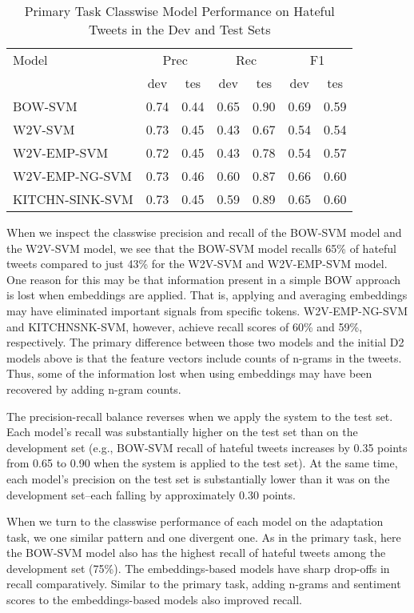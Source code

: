 \documentclass[11pt,a4paper]{article}
\begin{document}
\begin{table}[h]
\centering
\caption{Primary Task Classwise Model Performance on Hateful Tweets in the Dev and Test Sets}
\label{tab:prim_class_test}
\tiny
\begin{tabular}{lcccccc}
    \hline
Model
            & \multicolumn{2}{c}{Prec}
                    & \multicolumn{2}{c}{Rec}
                            & \multicolumn{2}{c}{F1}                \\
    &   dev  &   tes  &   dev  &   tes  &   dev  &   tes    \\
    \hline
BOW-SVM    &   0.74  &  0.44  & 0.65 & 0.90 & 0.69  &  0.59   \\
W2V-SVM   &   0.73  &   0.45  &   0.43  &   0.67  &   0.54  &  0.54 \\
W2V-EMP-SVM   &  0.72  & 0.45 &  0.43 & 0.78 &  0.54 & 0.57 \\
W2V-EMP-NG-SVM &  0.73 & 0.46 & 0.60  & 0.87 & 0.66 & 0.60 \\
KITCHN-SINK-SVM & 0.73  & 0.45 & 0.59 & 0.89 & 0.65 &  0.60 \\
    \hline
\end{tabular}
\end{table}


When we inspect the classwise precision and recall of the BOW-SVM model and the W2V-SVM model, we see that the BOW-SVM model recalls 65\% of hateful tweets compared to just 43\% for the W2V-SVM and W2V-EMP-SVM model. One reason for this may be that information present in a simple BOW approach is lost when embeddings are applied. That is, applying and averaging embeddings may have eliminated important signals from specific tokens. W2V-EMP-NG-SVM and KITCHNSNK-SVM, however, achieve recall scores of 60\% and 59\%, respectively. The primary difference between those two models and the initial D2 models above is that the feature vectors include counts of n-grams in the tweets. Thus, some of the information lost when using embeddings may have been recovered by adding n-gram counts.

The precision-recall balance reverses when we apply the system to the test set. Each model’s recall was substantially higher on the test set than on the development set (e.g., BOW-SVM recall of hateful tweets increases by 0.35 points from 0.65 to 0.90 when the system is applied to the test set). At the same time, each model’s precision on the test set is substantially lower than it was on the development set–each falling by approximately 0.30 points. 

When we turn to the classwise performance of each model on the adaptation task, we one similar pattern and one divergent one. As in the primary task, here the BOW-SVM model also has the highest recall of hateful tweets among the development set (75\%). The embeddings-based models have sharp drop-offs in recall comparatively. Similar to the primary task, adding n-grams and sentiment scores to the embeddings-based models also improved recall.
\end{document}
